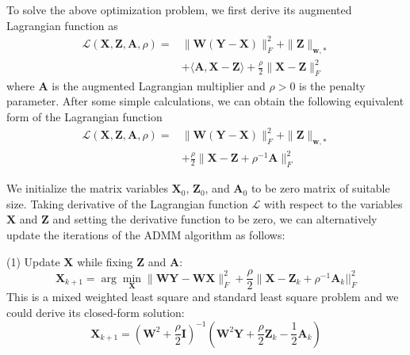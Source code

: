 \documentclass[10pt,twocolumn,letterpaper]{article}
\begin{document}
To solve the above optimization problem, we first derive its augmented Lagrangian function as 
\begin{equation}
\begin{split}
\mathcal{L}(\mathbf{X},\mathbf{Z},\mathbf{A},\rho)
=
&\|\mathbf{W}(\mathbf{Y}-\mathbf{X})\|_{F}^{2}
+
\|\mathbf{Z}\|_{\bm{w},*}
\\
&
+
\langle
\mathbf{A},\mathbf{X}-\mathbf{Z}
\rangle
+
\frac{\rho}{2}
\|\mathbf{X}-\mathbf{Z}\|_{F}^{2}
\end{split}
\end{equation}
where $\mathbf{A}$ is the augmented Lagrangian multiplier and $\rho>0$ is the penalty parameter. 
After some simple calculations, we can obtain the following equivalent form of the Lagrangian function
\begin{equation}
\begin{split}
\mathcal{L}(\mathbf{X},\mathbf{Z},\mathbf{A},\rho)
=
&
\|\mathbf{W}(\mathbf{Y}-\mathbf{X})\|_{F}^{2}
+
\|\mathbf{Z}\|_{\bm{w},*}
\\
&
+
\frac{\rho}{2}
\|\mathbf{X}-\mathbf{Z}+\rho^{-1}\mathbf{A}\|_{F}^{2}
\end{split}
\end{equation}

We initialize the matrix variables $\mathbf{X}_{0}$, $\mathbf{Z}_{0}$, and $\mathbf{A}_{0}$ to be zero matrix of suitable size.
Taking derivative of the Lagrangian function $\mathcal{L}$ with respect to the variables $\mathbf{X}$ and $\mathbf{Z}$ and setting the derivative function to be zero, we can alternatively update the iterations of the ADMM algorithm as follows:

(1) Update $\mathbf{X}$ while fixing $\mathbf{Z}$ and $\mathbf{A}$:
\begin{equation}
\mathbf{X}_{k+1}
=
\arg\min_{\mathbf{X}}
\|\mathbf{W}\mathbf{Y} - \mathbf{W}\mathbf{X}\|_{F}^{2} 
+
\frac{\rho}{2}\|\mathbf{X} - \mathbf{Z}_{k} + \rho^{-1}\mathbf{A}_{k}||_{F}^{2}
\end{equation}
This is a mixed weighted least square and standard least square problem and we could derive its closed-form solution:
\begin{equation}
\mathbf{X}_{k+1}
=
(\mathbf{W}^{2}+\frac{\rho}{2}\mathbf{I})^{-1}
(\mathbf{W}^{2}\mathbf{Y} + \frac{\rho}{2}\mathbf{Z}_{k} -\frac{1}{2}\mathbf{A}_{k})
\end{equation}
\end{document}
